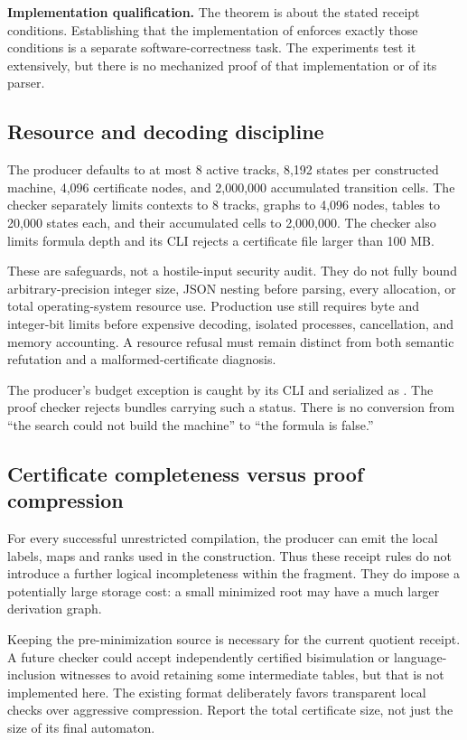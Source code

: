 \textbf{Implementation qualification.} The theorem is about the stated receipt conditions. Establishing that the implementation of  enforces exactly those conditions is a separate software-correctness task. The experiments test it extensively, but there is no mechanized proof of that implementation or of its parser.

\subsection{Resource and decoding discipline}
The producer defaults to at most 8 active tracks, 8,192 states per constructed machine, 4,096 certificate nodes, and 2,000,000 accumulated transition cells. The checker separately limits contexts to 8 tracks, graphs to 4,096 nodes, tables to 20,000 states each, and their accumulated cells to 2,000,000. The checker also limits formula depth and its CLI rejects a certificate file larger than 100 MB.

These are safeguards, not a hostile-input security audit. They do not fully bound arbitrary-precision integer size, JSON nesting before parsing, every allocation, or total operating-system resource use. Production use still requires byte and integer-bit limits before expensive decoding, isolated processes, cancellation, and memory accounting. A resource refusal must remain distinct from both semantic refutation and a malformed-certificate diagnosis.

The producer's budget exception is caught by its CLI and serialized as . The proof checker rejects bundles carrying such a status. There is no conversion from ``the search could not build the machine'' to ``the formula is false.''

\subsection{Certificate completeness versus proof compression}
For every successful unrestricted compilation, the producer can emit the local labels, maps and ranks used in the construction. Thus these receipt rules do not introduce a further logical incompleteness within the fragment. They do impose a potentially large storage cost: a small minimized root may have a much larger derivation graph.

Keeping the pre-minimization source is necessary for the current quotient receipt. A future checker could accept independently certified bisimulation or language-inclusion witnesses to avoid retaining some intermediate tables, but that is not implemented here. The existing format deliberately favors transparent local checks over aggressive compression. Report the total certificate size, not just the size of its final automaton.
